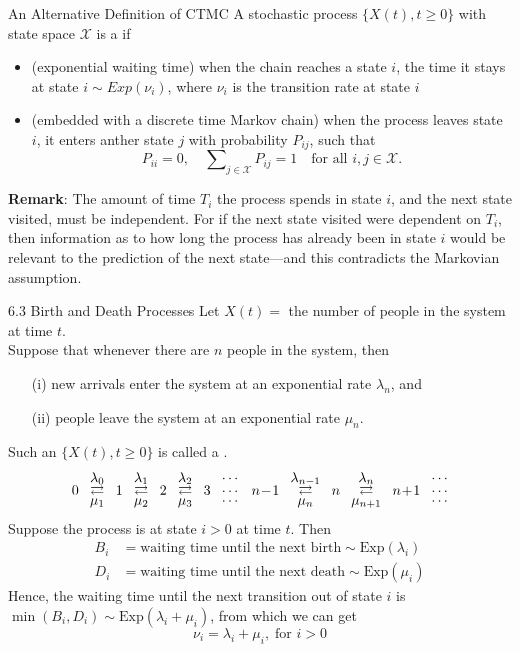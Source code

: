 \documentclass[letterpaper,handout, mathserif]{beamer}
\def\Sum{\sum\nolimits}
\def\X{\mathcal{X}}
\begin{document}
\begin{frame}{An Alternative Definition of CTMC}
A stochastic process $\{X(t),t\ge 0\}$ with state space $\X$ is a  if
\begin{itemize}
\item (exponential waiting time)
 when the chain reaches a state $i$, the time it stays at state $i\sim Exp(\nu_i)$, where $\nu_i$ is the transition rate at state $i$
\item (embedded with a discrete time Markov chain)
 when the process leaves state $i$, it enters anther state $j$ with probability $P_{ij}$, such that
    $$P_{ii}=0, \quad\Sum_{j\in\X} P_{ij}=1\quad\mbox{for all }i,j \in\X.$$
\end{itemize}
\textbf{Remark}: The amount of time $T_i$ the process spends in
state $i$, and the next state visited, must be independent.
For if the next state visited were dependent on $T_i$, then information as to how long the
process has already been in state $i$ would be relevant to the prediction of the next
state---and this contradicts the Markovian assumption.
\end{frame}
\begin{frame}{6.3 Birth and Death Processes}
Let $X(t)=$ the number of people in the system at time $t$.\\
Suppose that whenever there are $n$ people in the system, then
\begin{itemize}
\item [(i)] new arrivals enter the system at an exponential rate $\lambda_n$, and
\item [(ii)] people leave the system at an exponential rate $\mu_n.$
\end{itemize}
Such an $\{X(t),t\ge 0\}$ is called a .
$$
\arraycolsep=4pt
\begin{array}{ccccccccccccccc}
  & \lambda_0  && \lambda_1 && \lambda_2 && \cdots&  & \lambda_{n-1} && \lambda_n && \cdots\\[-3pt]
0 & \rightleftarrows & 1 & \rightleftarrows & 2 &\rightleftarrows& 3 & \cdots & n\!-\!1&\rightleftarrows & n &\rightleftarrows& n\!+\!1 & \cdots\\[-5pt]
  & \mu_1      && \mu_2     &&  \mu_3   && \cdots& & \mu_n && \mu_{n+1} && \cdots
\end{array}
$$
Suppose the process is at state $i>0$ at time $t$. Then
\begin{align*}
B_i &=\text{waiting time until the next birth} \sim \text{Exp}(\lambda_i)\\
D_i &=\text{waiting time until the next death} \sim \text{Exp}(\mu_i)
\end{align*}
Hence, the waiting time until the next transition out of state $i$ is
$\min(B_i, D_i)\sim \text{Exp}(\lambda_i+\mu_i)$, from which we can get
$$
\nu_i = \lambda_i + \mu_i,\;\text{for } i>0
$$
\end{frame}
\end{document}
